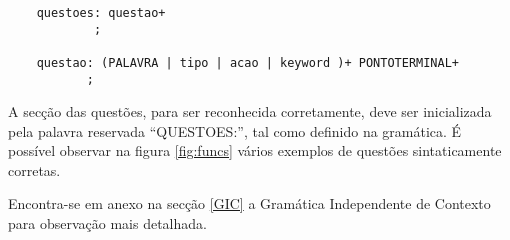\begin{verbatim}

    questoes: questao+
            ;

    questao: (PALAVRA | tipo | acao | keyword )+ PONTOTERMINAL+
           ;
\end{verbatim}

A secção das questões, para ser reconhecida corretamente, deve ser inicializada pela palavra reservada ``QUESTOES:'', tal como definido na gramática. É possível observar na figura \ref{fig:funcs} vários exemplos de questões sintaticamente corretas.

Encontra-se em anexo na secção \ref{GIC} a Gramática Independente de Contexto para observação mais detalhada.

